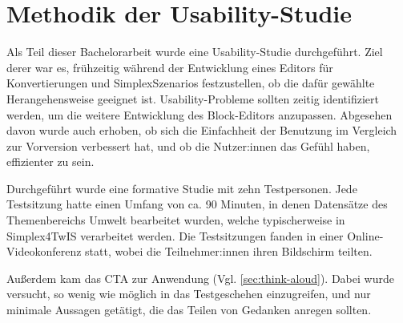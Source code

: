 \section{Methodik der Usability-Studie}
\label{sec:study-methods}

Als Teil dieser Bachelorarbeit wurde eine Usability-Studie durchgeführt. Ziel derer war es, frühzeitig während der Entwicklung eines Editors für Konvertierungen und SimplexSzenarios festzustellen, ob die dafür gewählte Herangehensweise geeignet ist. Usability-Probleme sollten zeitig identifiziert werden, um die weitere Entwicklung des Block-Editors anzupassen. Abgesehen davon wurde auch erhoben, ob sich die Einfachheit der Benutzung im Vergleich zur Vorversion verbessert hat, und ob die Nutzer:innen das Gefühl haben, effizienter zu sein.

Durchgeführt wurde eine formative Studie mit zehn Testpersonen. Jede Testsitzung hatte einen Umfang von ca. 90 Minuten, in denen Datensätze des Themenbereichs Umwelt bearbeitet wurden, welche typischerweise in Simplex4TwIS verarbeitet werden. Die Testsitzungen fanden in einer Online-Videokonferenz statt, wobei die Teilnehmer:innen ihren Bildschirm teilten.

Außerdem kam das \acf{CTA} zur Anwendung (Vgl. \ref{sec:think-aloud}). Dabei wurde versucht, so wenig wie möglich in das Testgeschehen einzugreifen, und nur minimale Aussagen getätigt, die das Teilen von Gedanken anregen sollten.
